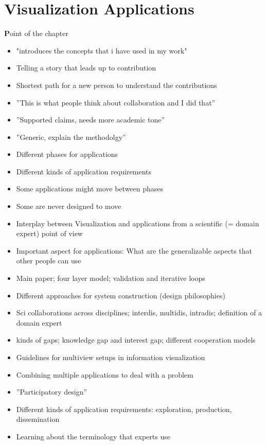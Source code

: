 \chapter{Visualization Applications}
\label{cha:visapp}

{\textbf Point of the chapter} 
\begin{itemize}
\item "introduces the concepts that i have used in my work"
\item Telling a story that leads up to contribution 
\item Shortest path for a new person to understand the contributions
\item ''This is what people think about collaboration and I did that''
\item ''Supported claims, needs more academic tone''
\item ''Generic, explain the methodolgy''
\end{itemize}


\begin{itemize}
\item Different phases for applications
\item Different kinds of application requirements
\item Some applications might move between phases
\item Some are never designed to move
\item Interplay between Visualization and applications from a scientific (= domain expert) point of view
\item Important aspect for applications: What are the generalizable aspects that other people can use
\item \cite{munzner2009nested} Main paper; four layer model; validation and iterative loops
\item \cite{tory2004human} Different approaches for system construction (design philosophies)
\item \cite{kirby2013visualization} Sci collaborations across disciplines; interdis, multidis, intradis; definition of a domain expert
\item \cite{van2006bridging} kinds of gaps; knowledge gap and interest gap; different cooperation models
\item \cite{wang2000guidelines} Guidelines for multiview setups in information visualization
\item Combining multiple applications to deal with a problem \cite{rungta2013manyvis}
\item ''Participatory design''
\item Different kinds of application requirements: exploration, production, dissemination
\item Learning about the terminology that experts use
\end{itemize}

